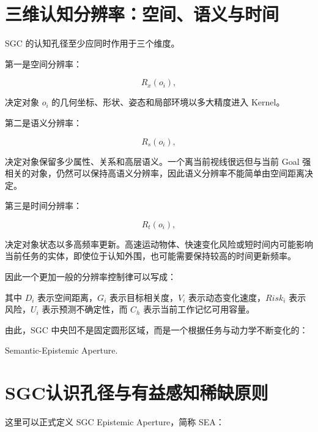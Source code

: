 \section{三维认知分辨率：空间、语义与时间}

SGC 的认知孔径至少应同时作用于三个维度。

第一是空间分辨率：

\[
R_x(o_i),
\]

决定对象 $o_i$ 的几何坐标、形状、姿态和局部环境以多大精度进入 Kernel。

第二是语义分辨率：

\[
R_s(o_i),
\]

决定对象保留多少属性、关系和高层语义。一个离当前视线很远但与当前 Goal 强相关的对象，仍然可以保持高语义分辨率，因此语义分辨率不能简单由空间距离决定。

第三是时间分辨率：

\[
R_t(o_i),
\]

决定对象状态以多高频率更新。高速运动物体、快速变化风险或短时间内可能影响当前任务的实体，即使位于认知外围，也可能需要保持较高的时间更新频率。

因此一个更加一般的分辨率控制律可以写成：

\begin{statementbox}
\centering
{}
\end{statementbox}

其中 $D_i$ 表示空间距离，$G_i$ 表示目标相关度，$V_i$ 表示动态变化速度，$Risk_i$ 表示风险，$U_i$ 表示预测不确定性，而 $C_h$ 表示当前工作记忆可用容量。

由此，SGC 中央凹不是固定圆形区域，而是一个根据任务与动力学不断变化的：

\begin{statementbox}
Semantic-Epistemic Aperture.
\end{statementbox}

\section{SGC认识孔径与有益感知稀缺原则}

这里可以正式定义 SGC Epistemic Aperture，简称 SEA：

\begin{statementbox}
\centering
{}
\end{statementbox}

